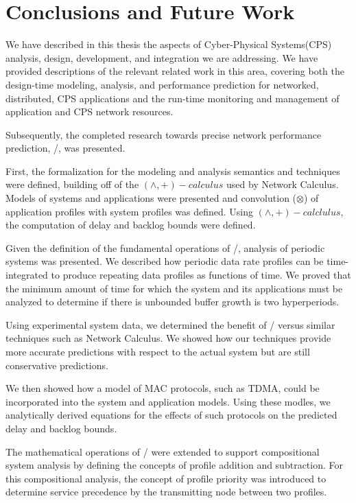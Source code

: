 \chapter{Conclusions and Future Work}
\label{ch:conclusions}

We have described in this thesis the aspects of Cyber-Physical
Systems(CPS) analysis, design, development, and integration we are
addressing.  We have provided descriptions of the relevant related
work in this area, covering both the design-time modeling, analysis,
and performance prediction for networked, distributed, CPS
applications and the run-time monitoring and management of application
and CPS network resources.

Subsequently, the completed research towards precise network
performance prediction, \shorttool/, was presented. 

First, the formalization for the modeling and analysis semantics and
techniques were defined, building off of the $(\wedge,+)-calculus$
used by Network Calculus.  Models of systems and applications were
presented and convolution ($\otimes$) of application profiles with
system profiles was defined.  Using $(\wedge,+)-calclulus$, the
computation of delay and backlog bounds were defined.

Given the definition of the fundamental operations of \shorttool/,
analysis of periodic systems was presented.  We described how periodic
data rate profiles can be time-integrated to produce repeating data
profiles as functions of time.  We proved that the minimum amount of
time for which the system and its applications must be analyzed to
determine if there is unbounded buffer growth is two hyperperiods.

Using experimental system data, we determined the benefit of
\shorttool/ versus similar techniques such as Network Calculus.  We
showed how our techniques provide more accurate predictions with
respect to the actual system but are still conservative predictions.  

We then showed how a model of MAC protocols, such as TDMA, could be
incorporated into the system and application models.  Using these
modles, we analytically derived equations for the effects of such
protocols on the predicted delay and backlog bounds.

The mathematical operations of \shorttool/ were extended to support
compositional system analysis by defining the concepts of profile
addition and subtraction.  For this compositional analysis, the
concept of profile priority was introduced to determine service
precedence by the transmitting node between two profiles.

